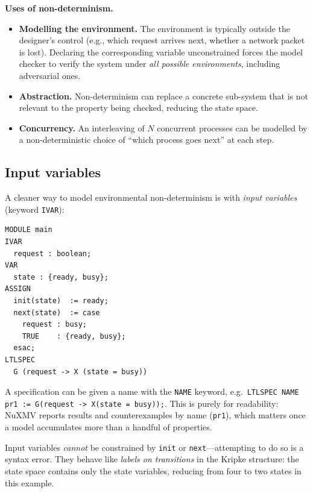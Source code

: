 \medskip\noindent\textbf{Uses of non-determinism.}
\begin{itemize}
  \item \textbf{Modelling the environment.}  The environment is typically
        outside the designer's control (e.g., which request arrives next,
        whether a network packet is lost).  Declaring the corresponding
        variable unconstrained forces the model checker to verify the system
        under \emph{all possible environments}, including adversarial ones.
  \item \textbf{Abstraction.}  Non-determinism can replace a concrete
        sub-system that is not relevant to the property being checked,
        reducing the state space.
  \item \textbf{Concurrency.}  An interleaving of $N$ concurrent processes
        can be modelled by a non-deterministic choice of ``which process
        goes next'' at each step.
\end{itemize}

\subsection{Input variables}
\label{sec:smv-ivar}

A cleaner way to model environmental non-determinism is with \emph{input
variables} (keyword \texttt{IVAR}):
\begin{verbatim}
MODULE main
IVAR
  request : boolean;
VAR
  state : {ready, busy};
ASSIGN
  init(state)  := ready;
  next(state)  := case
    request : busy;
    TRUE    : {ready, busy};
  esac;
LTLSPEC
  G (request -> X (state = busy))
\end{verbatim}

\begin{remark}
A specification can be given a name with the \texttt{NAME} keyword, e.g.\
\texttt{LTLSPEC NAME pr1 := G(request -> X(state = busy));}.  This is
purely for readability: NuXMV reports results and counterexamples by name
(\texttt{pr1}), which matters once a model accumulates more than a
handful of properties.
\end{remark}

Input variables \emph{cannot} be constrained by \texttt{init} or
\texttt{next}---attempting to do so is a syntax error.  They behave like
\emph{labels on transitions} in the Kripke structure: the state space
contains only the state variables, reducing from four to two states in this
example.

